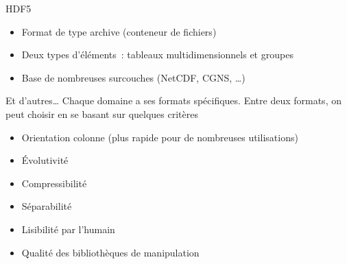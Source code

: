 \begin{frame}{HDF5}
  \begin{itemize}
    \item Format de type archive (conteneur de fichiers)
    \item Deux types d'éléments~: tableaux multidimensionnels et groupes
    \item Base de nombreuses surcouches (NetCDF, CGNS, …)
  \end{itemize}
\end{frame}

\begin{frame}{Et d'autres…}
  Chaque domaine a ses formats spécifiques. Entre deux formats, on peut choisir en se basant sur quelques critères

  \begin{itemize}
    \item Orientation colonne (plus rapide pour de nombreuses utilisations)
    \item Évolutivité
    \item Compressibilité
    \item Séparabilité
    \item Lisibilité par l'humain
    \item Qualité des bibliothèques de manipulation
  \end{itemize}
\end{frame}
